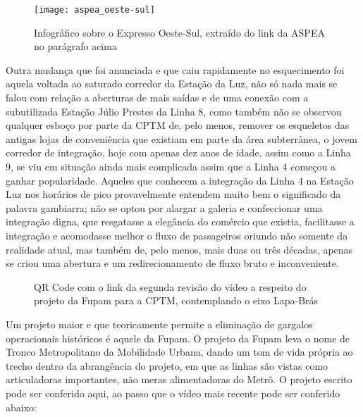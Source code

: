 \documentclass[11pt,fleqn]{book} %
\begin{document}
\begin{figure}[htb]
	\caption[Diagrama do Expresso Oeste-Sul]{Infográfico sobre o Expresso Oeste-Sul, extraído do link da ASPEA no parágrafo acima}
	\centering
	\texttt{[image: aspea\_oeste-sul]}
	\label{fig:aspea_oeste-sul}
\end{figure}

Outra mudança que foi anunciada e que caiu rapidamente no esquecimento foi aquela voltada ao saturado corredor da Estação da Luz, não só nada mais se falou com relação a aberturas de mais saídas e de uma conexão com a subutilizada Estação Júlio Prestes da Linha 8, como também não se observou qualquer esboço por parte da CPTM de, pelo menos, remover os esqueletos das antigas lojas de conveniência que existiam em parte da área subterrânea, o jovem corredor de integração, hoje com apenas dez anos de idade, assim como a Linha 9, se viu em situação ainda mais complicada assim que a Linha 4 começou a ganhar popularidade. Aqueles que conhecem a integração da Linha 4 na Estação Luz nos horários de pico provavelmente entendem muito bem o significado da palavra gambiarra; não se optou por alargar a galeria e confeccionar uma integração digna, que resgatasse a elegância do comércio que existia, facilitasse a integração e acomodasse melhor o fluxo de passageiros oriundo não somente da realidade atual, mas também de, pelo menos, mais duas ou três décadas, apenas se criou uma abertura e um redirecionamento de fluxo bruto e inconveniente.

\begin{wrapfigure}{l}{0.5\textwidth}
	\centering
	\caption[QR Code com renders do eixo Lapa-Brás pela Fupam]{QR Code com o link da segunda revisão do vídeo a respeito do projeto da Fupam para a CPTM, contemplando o eixo Lapa-Brás}
	\label{qr:video_fupam}
\end{wrapfigure}

Um projeto maior e que teoricamente permite a eliminação de gargalos operacionais históricos é aquele da Fupam. O projeto da Fupam leva o nome de Tronco Metropolitano da Mobilidade Urbana, dando um tom de vida própria ao trecho dentro da abrangência do projeto, em que as linhas são vistas como articuladoras importantes, não meras alimentadoras do Metrô. O projeto escrito pode ser conferido aqui, ao passo que o vídeo mais recente pode ser conferido abaixo:
\end{document}
